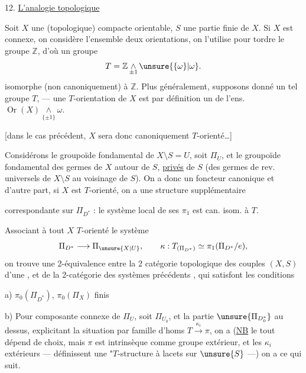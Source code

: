 
12. \uline{L'analogie topologique}

Soit \(X\) une  (topologique) compacte
orientable, \(S\) une partie finie de \(X\). Si \(X\) est connexe, on considère
l'ensemble \inserted{\unsure{\(\omega\)}}  deux orientations,
on l'utilise pour tordre le groupe \(\mathbb Z\), d'où un groupe 
\[
T=\mathbb Z\mathop{\wedge}\limits_{\pm1}\unsure{\{\omega\}|\omega}.
\]
isomorphe (non canoniquement) à \(\mathbb Z\). Plus généralement, supposons
donné un tel groupe \(T\),
--- une \(T\)-orientation de \(X\) est par définition un 
de l'ens. \(\operatorname{Or}(X)\mathop{\wedge}\limits_{\{\pm1\}}\omega\).

[dans le cas précédent, \(X\) sera donc canoniquement \(T\)-orienté\ldots]

Considérons le groupoïde fondamental de \(X\setminus S=U\), soit \(\Pi_U\),
et le groupoïde fondamental  des germes
 de \(X\) autour de \(S\), \uline{privés} de \(S\)
(des germes de rev. universels de \(X\setminus S\) au voisinage de \(S\)).
On a donc un foncteur canonique
et d'autre part,  si \(X\) est \(T\)-orienté, on a une
structure supplémentaire



correspondante sur  \(\Pi_{D^*}\) : le système local de
ses \(\pi_1\) est can. isom. à \(T\).

Associant à tout \(X\) \(T\)-orienté le système
\[
\Pi_{D^*}\longrightarrow\Pi_{\unsure{X|U}},\qquad
\kappa:T_{(\Pi_{D^*})}\simeq\pi_1(\Pi_{D^*}/e),
\]
on trouve une 2-équivalence entre la 2 catégorie topologique des
 couples \((X,S)\) d'une
, et de la 2-catégorie des systèmes
précédents , \unsure{(}qui satisfont les conditions

a) \(\pi_0(\Pi_{D^*})\),  \(\pi_0(\Pi_X)\) finis

b) Pour  composante connexe de \(\Pi_U\), soit
\(\Pi_{U_0}\), et la partie \(\unsure{\Pi_{D_0^*}}\) au dessus, explicitant la
situation  par 
 famille d'homs
\(T\xrightarrow{\kappa_i}\pi\), on a (\uline{NB} le tout dépend de choix,
mais \(\pi\) est intrinsèque comme groupe extérieur, et les \(\kappa_i\)
 extérieurs --- définissent une "\(T\)-structure à lacets
sur \(\unsure{S}\) ---) on a ce qui suit.

